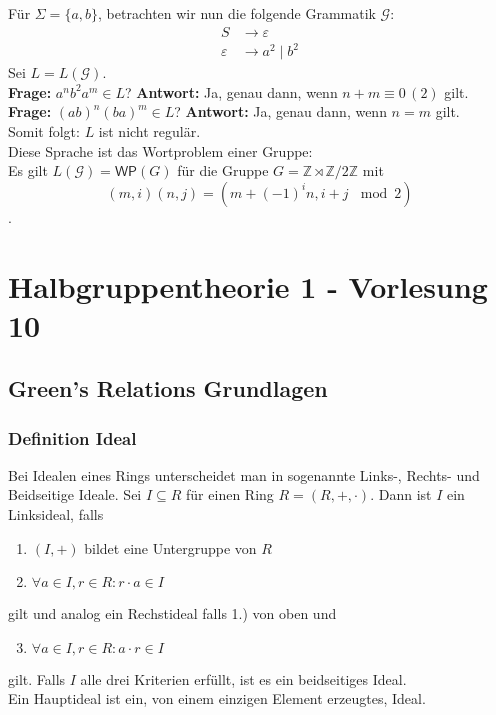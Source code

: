 \documentclass[12pt, german]{article}
\newcommand{\Z}{\mathbb{Z}}
\begin{document}
\begin{itemize}
		Für $\Sigma = \{a, b\}$, betrachten wir nun die folgende Grammatik $\mathscr{G}$:
		\begin{align*}
			S &\to \varepsilon \\ 
			\varepsilon &\to a^2 \mid b^2 
		\end{align*} 
		Sei $L=L(\mathscr{G})$.\\
		\textbf{Frage:} $a^nb^2a^m \in L$? 
		\newline
		\textbf{Antwort:} Ja, genau dann, wenn $n+m \equiv 0\, (2)$ gilt.\\
		\newline
		\textbf{Frage:} $(ab)^n(ba)^m \in L$? 
		\newline
		\textbf{Antwort:} Ja, genau dann, wenn $n=m$ gilt.\\
		\newline
		Somit folgt: $L$ ist nicht regulär.\\
		Diese Sprache ist das Wortproblem einer Gruppe:\\
		Es gilt $L(\mathscr{G})=\mathsf{WP}(G)$ für die Gruppe $G=\Z \rtimes \Z/2\Z$ mit $$(m,i)(n,j) = (m+(-1)^in, i+j\, \mod 2) $$.
	\end{itemize}
	
	\section{Halbgruppentheorie 1 - Vorlesung 10}
	\subsection{Green's Relations Grundlagen}
	\subsubsection{Definition Ideal}
	Bei Idealen eines Rings unterscheidet man in sogenannte Links-, Rechts- und Beidseitige Ideale. 
	Sei $I \subseteq R$ für einen Ring $R=(R,+,\cdot)$. Dann ist $I$ ein Linksideal, falls 
	\begin{enumerate}[label= \arabic*.)]
		\item $(I, +)$ bildet eine Untergruppe von $R$ 
		\item $\forall a \in I, r \in R : r \cdot a \in I  $
	\end{enumerate}
	gilt und analog ein Rechstideal falls 1.) von oben und
	\begin{enumerate}[label= \arabic*.)]
		\setcounter{enumi}{2}
		\item $\forall a \in I, r \in R : a \cdot r \in I  $
	\end{enumerate}
	gilt.
	Falls $I$ alle drei Kriterien erfüllt, ist es ein beidseitiges Ideal.\\
	Ein Hauptideal ist ein, von einem einzigen Element erzeugtes, Ideal.
	\newline
	
\end{document}
